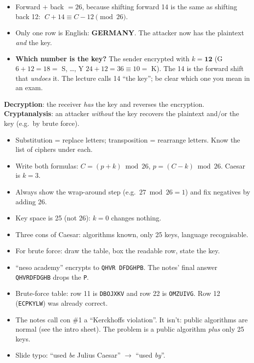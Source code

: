 \documentclass[10pt,a4paper]{article}
\newcommand{\ttx}[1]{\texttt{#1}}
\begin{document}
\begin{itemize}
  \item Forward $+$ back $= 26$, because shifting forward 14 is the same as shifting back 12: $\;C + 14 \equiv C - 12 \pmod{26}$.
  \item Only one row is English: \textbf{GERMANY}. The attacker now has the plaintext \emph{and} the key.
  \item \textbf{Which number is the key?} The sender encrypted with $k = \mathbf{12}$ (G $6+12=18=$ S, \dots, Y $24+12=36\equiv10=$ K). The 14 is the forward shift that \emph{undoes} it. The lecture calls 14 ``the key''; be clear which one you mean in an exam.
\end{itemize}

\begin{keybox}[title=Decryption vs.\ cryptanalysis]
\textbf{Decryption}: the receiver \emph{has} the key and reverses the encryption.\\
\textbf{Cryptanalysis}: an attacker \emph{without} the key recovers the plaintext and/or the key (e.g.\ by brute force).
\end{keybox}

\begin{examtip}
\begin{itemize}
  \item Substitution = replace letters; transposition = rearrange letters. Know the list of ciphers under each.
  \item Write both formulas: $C=(p+k)\bmod 26$, $p=(C-k)\bmod 26$. Caesar is $k=3$.
  \item Always show the wrap-around step (e.g.\ $27 \bmod 26 = 1$) and fix negatives by adding 26.
  \item Key space is 25 (not 26): $k=0$ changes nothing.
  \item Three cons of Caesar: algorithms known, only 25 keys, language recognisable.
  \item For brute force: draw the table, box the readable row, state the key.
\end{itemize}
\end{examtip}

\begin{fixbox}
\begin{itemize}
  \item ``neso academy'' encrypts to \ttx{QHVR DFDGHPB}. The notes' final answer \ttx{QHVRDFDGHB} drops the \ttx{P}.
  \item Brute-force table: row 11 is \ttx{DBOJXKV} and row 22 is \ttx{OMZUIVG}. Row 12 (\ttx{ECPKYLW}) was already correct.
  \item The notes call con \#1 a ``Kerckhoffs violation''. It isn't: public algorithms are normal (see the intro sheet). The problem is a public algorithm \emph{plus} only 25 keys.
  \item Slide typo: ``used \emph{be} Julius Caesar'' $\to$ ``used \emph{by}''.
\end{itemize}
\end{fixbox}
\end{document}
